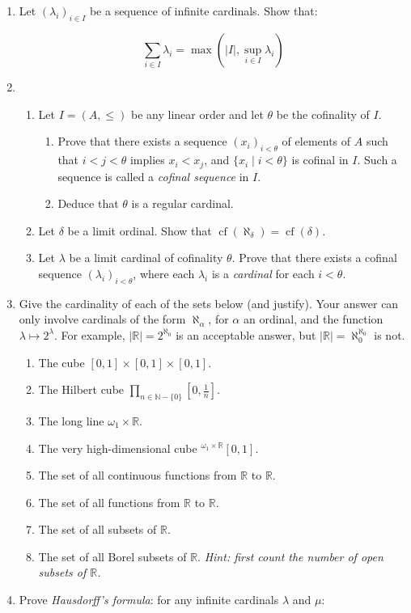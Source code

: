 \documentclass{amsart}
\theoremstyle{definition}
\newcommand{\cf}[1]{\operatorname{cf}(#1)}
\newcommand{\seq}[2]{\left(#1\right)_{#2}}
\newcommand{\fct}[2]{{}^{#1} {#2}}
\newcommand{\Nn}{\mathbb{N}}
\newcommand{\Rr}{\mathbb{R}}
\begin{document}
\begin{enumerate}
\item Let $\seq{\lambda_i}{i \in I}$ be a sequence of infinite cardinals. Show that:

  $$
  \sum_{i \in I} \lambda_i = \max (|I|, \sup_{i \in I} \lambda_i)
  $$

\item
  \begin{enumerate}

  \item Let $I = (A, \le)$ be any linear order and let $\theta$ be the cofinality of $I$.
    \begin{enumerate}
    \item Prove that there exists a sequence $\seq{x_i}{i < \theta}$ of elements of $A$ such that $i < j < \theta$ implies $x_i < x_j$, and $\{x_i \mid i < \theta\}$ is cofinal in $I$. Such a sequence is called a \emph{cofinal sequence} in $I$.
    \item Deduce that $\theta$ is a regular cardinal.
    \end{enumerate}
  \item Let $\delta$ be a limit ordinal. Show that $\cf{\aleph_{\delta}} = \cf{\delta}$.      
  \item Let $\lambda$ be a limit cardinal of cofinality $\theta$. Prove that there exists a cofinal sequence $\seq{\lambda_i}{i < \theta}$, where each $\lambda_i$ is a \emph{cardinal} for each $i < \theta$.
  \end{enumerate}
\item Give the cardinality of each of the sets below (and justify). Your answer can only involve cardinals of the form $\aleph_\alpha$, for $\alpha$ an ordinal, and the function $\lambda \mapsto 2^\lambda$. For example, $|\Rr| = 2^{\aleph_0}$ is an acceptable answer, but $|\Rr| = \aleph_0^{\aleph_0}$ is not.

  \begin{enumerate}
  \item The cube $[0,1] \times [0,1] \times [0,1]$.
  \item The Hilbert cube $\prod_{n \in \Nn - \{0\}} [0, \frac{1}{n}]$.
  \item The long line $\omega_1 \times \Rr$.
  \item The very high-dimensional cube $\fct{\omega_1 \times \Rr}{[0,1]}$.
  \item The set of all continuous functions from $\Rr$ to $\Rr$.
  \item The set of all functions from $\Rr$ to $\Rr$.
  \item The set of all subsets of $\Rr$.    
  \item The set of all Borel subsets of $\Rr$. \emph{Hint: first count the number of open subsets of $\Rr$.}
  \end{enumerate}
\item Prove \emph{Hausdorff's formula}: for any infinite cardinals $\lambda$ and $\mu$:


\end{enumerate}
\end{document}

